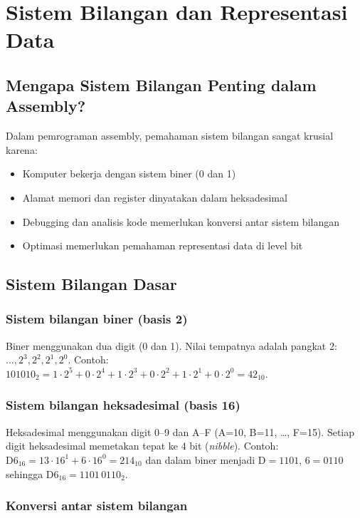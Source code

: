 \section{Sistem Bilangan dan Representasi Data}\label{sec:pengenalan-sistem-bilangan}

\subsection{Mengapa Sistem Bilangan Penting dalam Assembly?}
Dalam pemrograman assembly, pemahaman sistem bilangan sangat krusial karena:
\begin{itemize}
    \item Komputer bekerja dengan sistem biner (0 dan 1)
    \item Alamat memori dan register dinyatakan dalam heksadesimal
    \item Debugging dan analisis kode memerlukan konversi antar sistem bilangan
    \item Optimasi memerlukan pemahaman representasi data di level bit
\end{itemize}

\subsection{Sistem Bilangan Dasar}\label{subsec:pengenalan-dasar-bilangan}

\subsubsection{Sistem bilangan biner (basis 2)}
Biner menggunakan dua digit (0 dan 1). Nilai tempatnya adalah pangkat 2: \(\ldots, 2^3, 2^2, 2^1, 2^0\). Contoh: \(101010_2 = 1\cdot 2^5 + 0\cdot 2^4 + 1\cdot 2^3 + 0\cdot 2^2 + 1\cdot 2^1 + 0\cdot 2^0 = 42_{10}\).

\subsubsection{Sistem bilangan heksadesimal (basis 16)}
Heksadesimal menggunakan digit 0--9 dan A--F (A=10, B=11, \ldots, F=15). Setiap digit heksadesimal memetakan tepat ke 4 bit (\textit{nibble}). Contoh: \(\mathrm{D6}_{16} = 13\cdot 16^1 + 6\cdot 16^0 = 214_{10}\) dan dalam biner menjadi \(\mathrm{D} = 1101\), \(6 = 0110\) sehingga \(\mathrm{D6}_{16} = 1101\,0110_2\).

\subsubsection{Konversi antar sistem bilangan}
